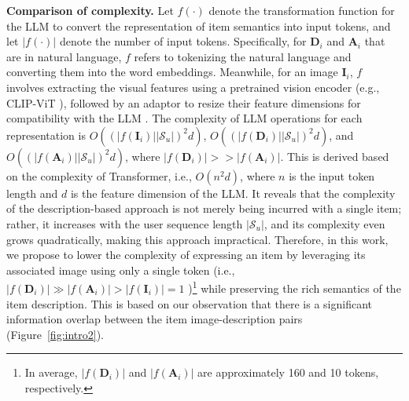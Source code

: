 \documentclass[sigconf]{acmart}
\begin{document}
\smallskip
\noindent\textbf{Comparison of complexity.}
Let $f(\cdot)$ denote the transformation function for the LLM to convert the representation of item semantics into input tokens, and let $|f(\cdot)|$ denote the number of input tokens. Specifically, for $\mathbf{D}_i$ and $\mathbf{A}_i$ that are in natural language, $f$ refers to tokenizing the natural language and converting them into the word embeddings. Meanwhile, for an image $\mathbf{I}_i$, $f$ involves extracting the visual features using a pretrained vision encoder (e.g., CLIP-ViT \cite{radford2021learning}), followed by an adaptor to resize their feature dimensions for compatibility with the LLM \cite{liu2024visual,li2023blip}. The complexity of LLM operations for each representation is $O((|f(\mathbf{I}_i)| |\mathcal{S}_u|)^2d)$, $O((|f(\mathbf{D}_i)| |\mathcal{S}_u|)^2d)$, and $O((|f(\mathbf{A}_i)| |\mathcal{S}_u|)^2d)$, where $|f(\mathbf{D}_i)| >> |f(\mathbf{A}_i)|$. This is derived based on the complexity of Transformer, i.e., $O(n^2d)$, where $n$ is the input token length and $d$ is the feature dimension of the LLM. It reveals that the complexity of the description-based approach is not merely being incurred with a single item; rather, it increases with the user sequence length $|\mathcal{S}_u|$, and its complexity even grows quadratically, making this approach impractical.
Therefore, in this work, we propose to lower the complexity of expressing an item by leveraging its associated image using only a single token (i.e., $|f(\mathbf{D}_i)| \gg |f(\mathbf{A}_i)| > |f(\mathbf{I}_i)|=1$ )\footnote{In average, $|f(\mathbf{D}_i)|$ and $|f(\mathbf{A}_i)|$ are approximately 160 and 10 tokens, respectively.} while preserving the rich semantics of the item description. This is based on our observation that there is a significant information overlap between the item image-description pairs (Figure~\ref{fig:intro2}).

\end{document}
